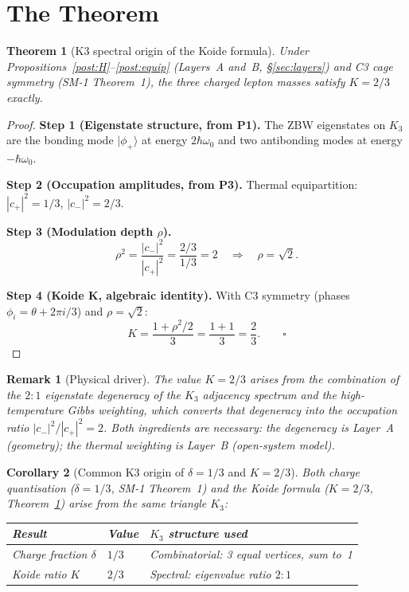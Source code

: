 \documentclass[11pt]{article}
\newtheorem{theorem}{Theorem}[section]
\newtheorem{corollary}[theorem]{Corollary}
\newtheorem{remark}{Remark}[section]
\begin{document}
\section{The Theorem}
\label{sec:theorem}

\begin{theorem}[K3 spectral origin of the Koide formula]
\label{thm:K3Koide}
Under Propositions~\ref{post:H}--\ref{post:equip}
(Layers~A and~B, \S\ref{sec:layers}) and C3 cage symmetry
(SM-1 Theorem~1), the three charged lepton masses satisfy
$K = 2/3$ exactly.
\end{theorem}

\begin{proof}
\textbf{Step 1 (Eigenstate structure, from P1).}
The ZBW eigenstates on $K_3$ are the bonding mode $|\phi_+\rangle$ at
energy $2\hbar\omega_0$ and two antibonding modes at energy $-\hbar\omega_0$.

\textbf{Step 2 (Occupation amplitudes, from P3).}
Thermal equipartition: $|c_+|^2 = 1/3$, $|c_-|^2 = 2/3$.

\textbf{Step 3 (Modulation depth $\rho$).}
\[
\rho^2 = \frac{|c_-|^2}{|c_+|^2} = \frac{2/3}{1/3} = 2
\quad\Rightarrow\quad \rho = \sqrt{2}.
\]

\textbf{Step 4 (Koide K, algebraic identity).}
With C3 symmetry (phases $\phi_i = \theta + 2\pi i/3$) and
$\rho = \sqrt{2}$:
\[
K = \frac{1 + \rho^2/2}{3} = \frac{1 + 1}{3} = \frac{2}{3}.\qquad\square
\]
\end{proof}

\begin{remark}[Physical driver]
The value $K = 2/3$ arises from the combination of the $2\!:\!1$
eigenstate degeneracy of the $K_3$ adjacency spectrum and the
high-temperature Gibbs weighting, which converts that degeneracy
into the occupation ratio $|c_-|^2/|c_+|^2 = 2$.  Both ingredients
are necessary: the degeneracy is Layer~A (geometry); the thermal
weighting is Layer~B (open-system model).
\end{remark}

\begin{corollary}[Common K3 origin of $\delta = 1/3$ and $K = 2/3$]
\label{cor:common}
Both charge quantisation ($\delta = 1/3$, SM-1 Theorem~1) and the
Koide formula ($K = 2/3$, Theorem~\ref{thm:K3Koide}) arise from the
same triangle $K_3$:
\begin{center}
\begin{tabular}{lll}
\toprule
Result & Value & $K_3$ structure used \\
\midrule
Charge fraction $\delta$ & $1/3$ & Combinatorial: 3 equal vertices, sum to~1 \\
Koide ratio $K$ & $2/3$ & Spectral: eigenvalue ratio $2:1$ \\
\bottomrule
\end{tabular}
\end{center}
\end{corollary}
\end{document}
